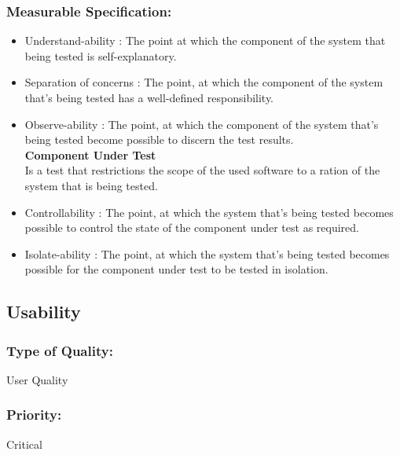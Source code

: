 \documentclass[11pt]{article}
\begin{document}
		\subsubsection{Measurable Specification:}
		\begin{itemize}
			\item Understand-ability : The point at which the component of the system that being tested is self-explanatory.
			\item Separation of concerns : The point, at which the component of the system that's being tested has a well-defined responsibility.
			\item Observe-ability : The point, at which the component of the system that’s being tested become possible to discern the test results. \\
						
			\textbf{Component Under Test}\\
			Is a test that restrictions the scope of the used software to a ration of the system that is being tested.
			
			\item Controllability : The point, at which the system that’s being tested becomes possible to control the state of the component under test as required.
			\item Isolate-ability : The point, at which the system that’s being tested becomes possible for the component under test to be tested in isolation.
			
		\end{itemize}
		
		
	\subsection{Usability }
		
		\subsubsection{Type of Quality:}
			\textbf{} User Quality
		
		\subsubsection{Priority:}
		\textbf{} Critical
\end{document}
